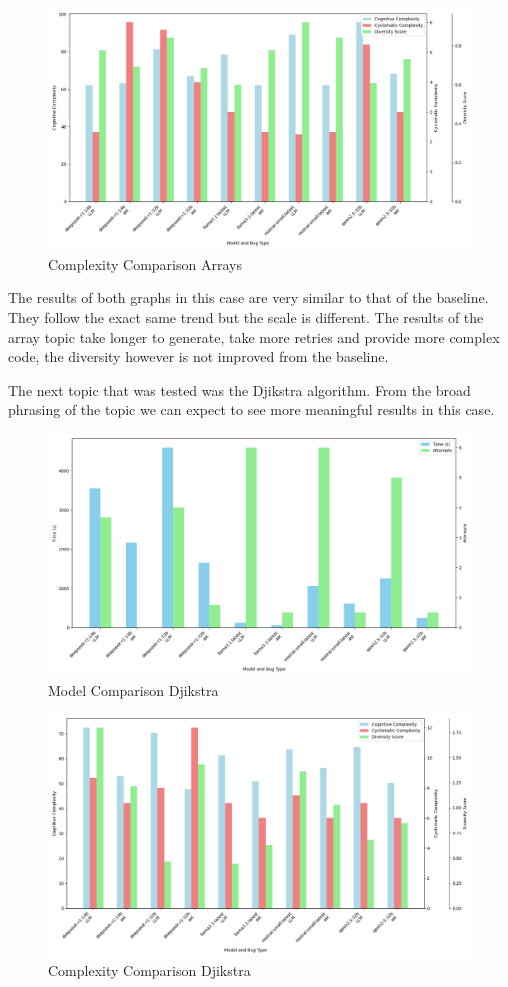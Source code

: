 \documentclass[12pt]{extarticle}
\begin{document}
\begin{figure}[h!]
\centering
\includegraphics[width=0.8\linewidth]{Images/Complexity_Comparison_Arrays.png}
\caption{Complexity Comparison Arrays}
\label{fig:Complexity_Comparison_Arrays}
\end{figure}

The results of both graphs in this case are very similar to that of the baseline. They follow the exact same trend but the scale is different. The results of the array topic take longer to generate, take more retries and provide more complex code, the diversity however is not improved from the baseline.

The next topic that was tested was the Djikstra algorithm. From the broad phrasing of the topic we can expect to see more meaningful results in this case.

\begin{figure}[h!]
\centering
\includegraphics[width=0.8\linewidth]{Images/Model_Comparison_Djikstra.png}
\caption{Model Comparison Djikstra}
\label{fig:Model_Comparison_Djikstra}
\end{figure}

\begin{figure}[h!]
\centering
\includegraphics[width=0.8\linewidth]{Images/Complexity_Comparison_Djikstra.png}
\caption{Complexity Comparison Djikstra}
\label{fig:Complexity_Comparison_Djikstra}
\end{figure}
\end{document}

